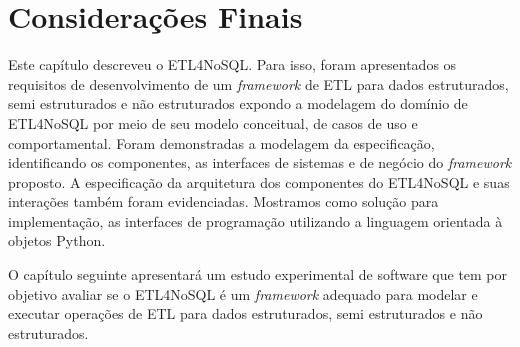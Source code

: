 






\section{Considerações Finais}

Este capítulo descreveu o ETL4NoSQL. Para isso, foram apresentados os requisitos de desenvolvimento de um \textit{framework} de ETL para dados estruturados, semi estruturados e não estruturados expondo a modelagem do domínio de ETL4NoSQL por meio de seu modelo conceitual, de casos de uso e comportamental. Foram demonstradas a modelagem da especificação, identificando os componentes, as interfaces de sistemas e de negócio do  \textit{framework} proposto. A especificação da arquitetura dos componentes do ETL4NoSQL e suas interações também foram evidenciadas. Mostramos como solução para implementação, as interfaces de programação utilizando a linguagem orientada à objetos Python.

O capítulo seguinte apresentará um estudo experimental de software que tem por objetivo avaliar se o ETL4NoSQL é um \textit{framework} adequado para modelar e executar operações de ETL para dados estruturados, semi estruturados e não estruturados.

